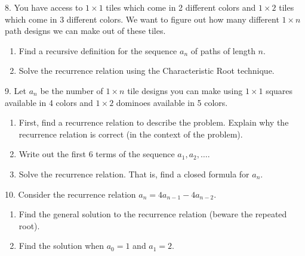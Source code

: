 \documentclass[10pt,]{book}
\theoremstyle{plain}
\theoremstyle{definition}
\theoremstyle{definition}
\theoremstyle{definition}
\numberwithin{equation}{chapter}
\begin{document}
\begin{exerciselist}
\par\smallskip
\item[8.]\hypertarget{exercise-212}{}
            You have access to \(1 \times 1\) tiles which come in 2 different colors and \(1\times 2\) tiles which come in 3 different colors. We want to figure out how many different \(1 \times n\) path designs we can make out of these tiles.
\leavevmode%
\begin{enumerate}[label=(\alph*)]
\item\hypertarget{li-1037}{}
                Find a recursive definition for the sequence \(a_n\) of paths of length \(n\).
\item\hypertarget{li-1038}{}
                Solve the recurrence relation using the Characteristic Root technique.
\end{enumerate}
\par\smallskip
\item[9.]\hypertarget{exercise-213}{}
            Let \(a_n\) be the number of \(1 \times n\) tile designs you can make using \(1 \times 1\) squares available in 4 colors and \(1 \times 2\) dominoes available in 5 colors.
\leavevmode%
\begin{enumerate}[label=(\alph*)]
\item\hypertarget{li-1039}{}
                First, find a recurrence relation to describe the problem. Explain why the recurrence relation is correct (in the context of the problem).


\item\hypertarget{li-1040}{}
                Write out the first 6 terms of the sequence \(a_1, a_2, \ldots\).


\item\hypertarget{li-1041}{}
                Solve the recurrence relation. That is, find a closed formula for \(a_n\).


\end{enumerate}
\par\smallskip
\item[10.]\hypertarget{exercise-214}{}
            Consider the recurrence relation \(a_n = 4a_{n-1} - 4a_{n-2}\).
\leavevmode%
\begin{enumerate}[label=(\alph*)]
\item\hypertarget{li-1042}{}
                Find the general solution to the recurrence relation (beware the repeated root).


\item\hypertarget{li-1043}{}
                Find the solution when \(a_0 = 1\) and \(a_1 = 2\).



\end{enumerate}
\end{exerciselist}
\end{document}
